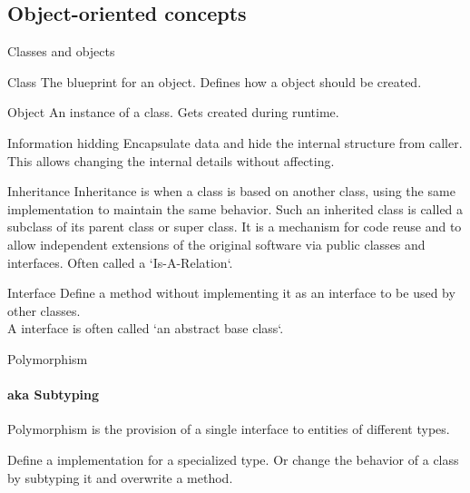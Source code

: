 \documentclass{beamer}
\begin{document}
\subsection{Object-oriented concepts}

\begin{frame}{Classes and objects}

\begin{block}{Class}
The blueprint for an object. Defines how a object should be created.
\end{block}

\begin{block}{Object}
An instance of a class. Gets created during runtime.
\end{block}

\end{frame}

\begin{frame}{Information hidding}
Encapsulate data and hide the internal structure from caller. This allows
changing the internal details without affecting.
\end{frame}

\begin{frame}{Inheritance}
Inheritance is when a class is based on another class, using the same
implementation to maintain the same behavior.
Such an inherited class is called a subclass of its parent class or super class.
It is a mechanism for code reuse and to allow independent extensions of the
original software via public classes and interfaces.
 Often called a `Is-A-Relation`.
\end{frame}

\begin{frame}{Interface}
Define a method without implementing it as an interface to be used by other
classes. \\
A interface is often called `an abstract base class`.
\end{frame}

\begin{frame}{Polymorphism}
\framesubtitle{aka Subtyping}
Polymorphism is the provision of a single interface to entities of different
types.

Define a implementation for a specialized type. Or change the behavior of a
class by subtyping it and overwrite a method.
\end{frame}
\end{document}
